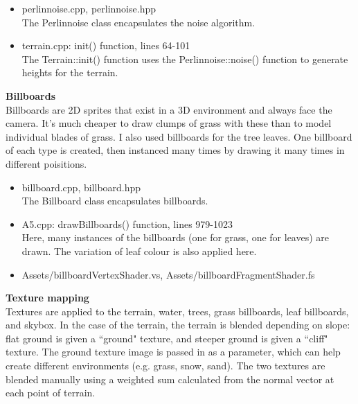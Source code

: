 \documentclass{article}
\begin{document}
	\begin{itemize}
	\item perlinnoise.cpp, perlinnoise.hpp \\
	The Perlinnoise class encapsulates the noise algorithm.
	\item terrain.cpp: init() function, lines 64-101 \\
	The Terrain::init() function uses the Perlinnoise::noise() function to generate heights for the terrain.
	\end{itemize}

	\large\noindent\textbf{Billboards}
	\normalsize
	\\

	Billboards are 2D sprites that exist in a 3D environment and always face the camera. It's much cheaper to draw clumps of grass with these than to model individual blades of grass. I also used billboards for the tree leaves. One billboard of each type is created, then instanced many times by drawing it many times in different poisitions.
	\\

	\begin{itemize}
	\item billboard.cpp, billboard.hpp \\
	The Billboard class encapsulates billboards. 
	\item A5.cpp: drawBillboards() function, lines 979-1023 \\
	Here, many instances of the billboards (one for grass, one for leaves) are drawn. The variation of leaf colour is also applied here.
	\item Assets/billboardVertexShader.vs, Assets/billboardFragmentShader.fs \\
	\end{itemize}

	\large\noindent\textbf{Texture mapping}
	\normalsize
	\\

	Textures are applied to the terrain, water, trees, grass billboards, leaf billboards, and skybox. In the case of the terrain, the terrain is blended depending on slope: flat ground is given a ``ground" texture, and steeper ground is given a ``cliff" texture. The ground texture image is passed in as a parameter, which can help create different environments (e.g. grass, snow, sand). The two textures are blended manually using a weighted sum calculated from the normal vector at each point of terrain.
	\\
\end{document}
